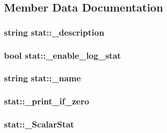 \subsection{Member Data Documentation}
\hypertarget{classstat_ac9613e6f886704c8582aa6d3ef82890c}{
\subsubsection[{\_\-description}]{\setlength{\rightskip}{0pt plus 5cm}string {\bf stat::\_\-description}}}
\label{classstat_ac9613e6f886704c8582aa6d3ef82890c}
\hypertarget{classstat_ab9551cc95cb38f1e068f76383e082374}{
\subsubsection[{\_\-enable\_\-log\_\-stat}]{\setlength{\rightskip}{0pt plus 5cm}bool {\bf stat::\_\-enable\_\-log\_\-stat}}}
\label{classstat_ab9551cc95cb38f1e068f76383e082374}
\hypertarget{classstat_a51eae1107b5388fb7823b00954228053}{
\subsubsection[{\_\-name}]{\setlength{\rightskip}{0pt plus 5cm}string {\bf stat::\_\-name}}}
\label{classstat_a51eae1107b5388fb7823b00954228053}
\hypertarget{classstat_a29dc267b4bc24e2013069ca1164edfbf}{
\subsubsection[{\_\-print\_\-if\_\-zero}]{ {\bf stat::\_\-print\_\-if\_\-zero}}}
\label{classstat_a29dc267b4bc24e2013069ca1164edfbf}
\hypertarget{classstat_a9ac5680b65cf0f05de0494efcd7b1371}{
\subsubsection[{\_\-ScalarStat}]{ {\bf stat::\_\-ScalarStat}}}
\label{classstat_a9ac5680b65cf0f05de0494efcd7b1371}



